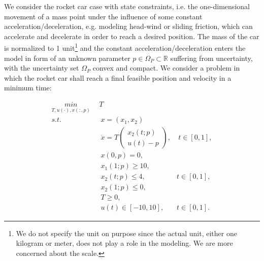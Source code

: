 	We consider the rocket car case with state constraints, i.e. the one-dimensional movement of a mass point under the influence of some constant acceleration/deceleration, e.g. modeling head-wind or sliding friction, which can accelerate and decelerate in order to reach a desired position. The mass of the car is normalized to 1 unit\footnote{We do not specify the unit on purpose since the actual unit, either one kilogram or meter, does not play a role in the modeling. We are more concerned about the scale.} and the constant acceleration/deceleration enters the model in form of an unknown parameter $p \in \Omega_P \subset \mathbb{R}$ suffering from uncertainty, with the uncertainty set $\Omega_P$ convex and compact. We consider a problem in which the rocket car shall reach a final feasible position and velocity in a minimum time: 
	
	
	
	\begin{subequations}
		\begin{align}
			\underset{T, u(\cdot), x(:,p)}{min} \   & \  T \\ 
			s.t.  & \ \ x = (x_1, x_2)   \label{rc_x} \\ 
			& \ \  \dot{x} = T  \begin{pmatrix}  x_2(t;p) \\ u(t)-p   \end{pmatrix}, & \ t \in [0,1],  \label{rc_partial} \\
			& \ \ x(0,p) = 0, \label{rc_t0}\\
			& \ \ x_1(1;p) \geq 10, \label{rc_x1_t1} \\
			& \ \ x_2(t;p) \leq 4, & t \in [0,1], \label{rc_x2_tc} \\
			& \ \ x_2(1;p) \leq 0, \label{rc_x2_t1}  \\
			& \ \ T \geq 0, \\
			& \ \ u(t) \in [-10, 10], & t \in [0,1]. 
		\end{align}
		\label{rc}
	\end{subequations}
	
